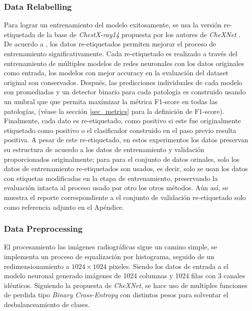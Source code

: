 {\subsubsection{Data Relabelling}
\label{ssec_relabelling}

Para lograr un entrenamiento del modelo exitosamente, se usa la versión re-etiquetada de la base de
\textit{ChestX-ray14} propuesta por los autores de \textit{CheXNet} \cite{rajpurkar2018deep}. De
acuerdo a \cite{rajpurkar2018deep}, los datos re-etiquetados permiten mejorar el proceso de entrenamiento
significativamente. Cada re-etiquetado es realizado a través del entrenamiento de múltiples modelos
de redes neuronales con los datos originales como entrada, los modelos con mejor accuracy en la
evaluación del dataset original son conservados. Después, las predicciones individuales de cada
modelo son promediadas y un detector binario para cada patología es construido usando un umbral que
que permita maximizar la métrica F1-score en todas las patologías, (véase la sección \ref{sec_metrics}
para la definición de F1-score). Finalmente, cada dato es re-etiquetado, como positivo si este fue
originalmente etiquetado como positivo o el clasificador construido en el paso previo resulta positiva.
A pesar de este re-etiquetado, en estos experimentos los datos preservan su estructura de acuerdo a
los datos de entrenamiento y validación proporcionados originalmente; para para el conjunto de datos
orinales, solo los datos de entrenamiento re-etiquetados son usados, es decir, solo se usan los datos
con etiquetas modificadas en la etapa de entrenamiento, preservando la evaluación intacta al proceso
usado por otro los otros métodos. Aún así, se muestra el reporte correspondiente a el conjunto de
validación re-etiquetado solo como referencia adjunto en el Apéndice.

\subsubsection{Data Preprocessing}

El procesamiento las imágenes radiográficas sigue un camino simple, se implementa un proceso de
equalización por histograma, seguido de un redimensionamiento a $1024 \times 1024$ pixeles. Siendo
los datos de entrada a el modelo neuronal generado imágenes de 1024  columnas y 1024 filas con 3
canales idénticos. Siguiendo la propuesta de \textit{CheXNet}, se hace uso de multiples funciones de
perdida tipo \textit{Binary Cross-Entropy} con distintos pesos para solventar el desbalanceamiento
de clases.

}
